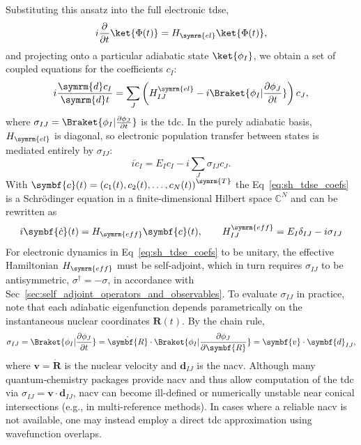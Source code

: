 Substituting this ansatz into the full electronic \acrshort{tdse},
\begin{equation}
i\frac{\partial}{\partial t}\ket{\Phi(t)}=H_{\symrm{el}}\ket{\Phi(t)},
\end{equation}
and projecting onto a particular adiabatic state $\ket{\phi_I}$, we obtain a set of coupled equations for the coefficients $c_I$:
\begin{equation}\label{eq:tsh_eom}
i\frac{\symrm{d}c_I}{\symrm{d}t}=\sum_J\left(H_{IJ}^{\symrm{el}}-i\Braket{\phi_I\vert\frac{\partial\phi_J}{\partial t}}\right)c_J,
\end{equation}
where $\sigma_{IJ}=\Braket{\phi_I\vert\frac{\partial\phi_J}{\partial t}}$ is the \acrfull{tdc}. In the purely adiabatic basis, $H_{\symrm{el}}$ is diagonal, so electronic population transfer between states is mediated entirely by $\sigma_{IJ}$:
\begin{equation}\label{eq:sh_tdse_coefs}
i\dot c_I=E_I c_I-i\sum_J\sigma_{IJ}c_J.
\end{equation}
With $\symbf{c}(t)=\left(c_1(t),c_2(t),\dots,c_N(t)\right)^{\symrm{T}}$ the Eq~\eqref{eq:sh_tdse_coefs} is a Schr\"odinger equation in a finite-dimensional Hilbert space $\mathbb{C}^N$ and can be rewritten as
\begin{equation}
i\symbf{\dot{c}}(t)=H_{\symrm{eff}}\symbf{c}(t),\qquad H_{IJ}^{\symrm{eff}}=E_I\delta_{IJ}-i\sigma_{IJ}
\end{equation}
For electronic dynamics in Eq~\eqref{eq:sh_tdse_coefs} to be unitary, the effective Hamiltonian $H_{\symrm{eff}}$ must be self-adjoint, which in turn requires $\sigma_{IJ}$ to be antisymmetric, $\sigma^\dagger=-\sigma$, in accordance with Sec~\ref{sec:self_adjoint_operators_and_observables}. To evaluate $\sigma_{IJ}$ in practice, note that each adiabatic eigenfunction depends parametrically on the instantaneous nuclear coordinates $\symbf{R}(t)$. By the chain rule,
\begin{equation}
\sigma_{IJ}=\Braket{\phi_I\vert\frac{\partial\phi_J}{\partial t}}=\dot{\symbf{R}}\cdot\Braket{\phi_I\vert\frac{\partial\phi_J}{\partial\symbf{R}}}=\symbf{v}\cdot\symbf{d}_{IJ},
\end{equation}
where $\symbf{v}=\dot{\symbf{R}}$ is the nuclear velocity and $\symbf{d}_{IJ}$ is the \acrfull{nacv}. Although many quantum‐chemistry packages provide \acrshort{nacv} and thus allow computation of the \acrshort{tdc} via $\sigma_{IJ}=\symbf{v}\cdot\symbf{d}_{IJ}$, \acrshort{nacv} can become ill-defined or numerically unstable near conical intersections (e.g., in multi-reference methods). In cases where a reliable \acrshort{nacv} is not available, one may instead employ a direct \acrshort{tdc} approximation using wavefunction overlaps.
